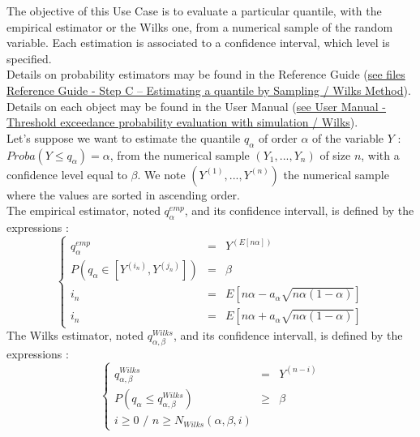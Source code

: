 \renewcommand{\filename}{docUC_CentralUncertainty_QuantileEstimation.tex}
\renewcommand{\filetitle}{UC : Quantile estimations : Wilks and empirical estimators}

\HeaderIIILevel




The objective of this Use Case is to evaluate a particular quantile, with the empirical estimator or the Wilks one, from a numerical sample of the random variable. Each estimation is associated to a confidence interval, which level is specified. \\


Details on probability estimators  may be found in the Reference Guide (\href{OpenTURNS_ReferenceGuide.pdf}{see files Reference Guide - Step C -- Estimating a quantile by Sampling / Wilks Method}).\\


Details on each object may be found in the User Manual  (\href{OpenTURNS_UserManual_TUI.pdf}{see User Manual - Threshold exceedance probability evaluation with simulation / Wilks}).\\



Let's suppose we want to estimate the quantile $q_{\alpha}$ of order $\alpha$ of the variable $Y$ : $Proba(Y \leq q_{\alpha}) = \alpha$, from the numerical sample $(Y_1, ..., Y_n)$ of size $n$, with a confidence level equal to $\beta$. We note $(Y^(1), ..., Y^(n))$ the numerical sample where the values are sorted in ascending order.\\
The empirical estimator,  noted $q_{\alpha}^{emp}$, and its confidence intervall, is defined by the expressions :
$$
\left\{
  \begin{array}{lcl}
    q_{\alpha}^{emp} & = & Y^{(E[n\alpha])} \\
    P(q_{\alpha} \in [Y^{(i_n)}, Y^{(j_n)}]) & = & \beta \\
    i_n & = & E[n\alpha - a_{\alpha}\sqrt{n\alpha(1-\alpha)}] \\
    i_n & = & E[n\alpha + a_{\alpha}\sqrt{n\alpha(1-\alpha)}]
  \end{array}
\right.
$$
The Wilks estimator,  noted $q_{\alpha, \beta}^{Wilks}$, and its confidence intervall, is defined by the expressions :
$$
\left\{
  \begin{array}{lcl}
    q_{\alpha, \beta}^{Wilks} & = & Y^{(n-i)} \\
    P(q_{\alpha}  \leq q_{\alpha, \beta}^{Wilks}) & \geq & \beta \\
    i\geq 0 \, \, /  \, \, n \geq N_{Wilks}(\alpha, \beta,i)
  \end{array}
\right.
$$


